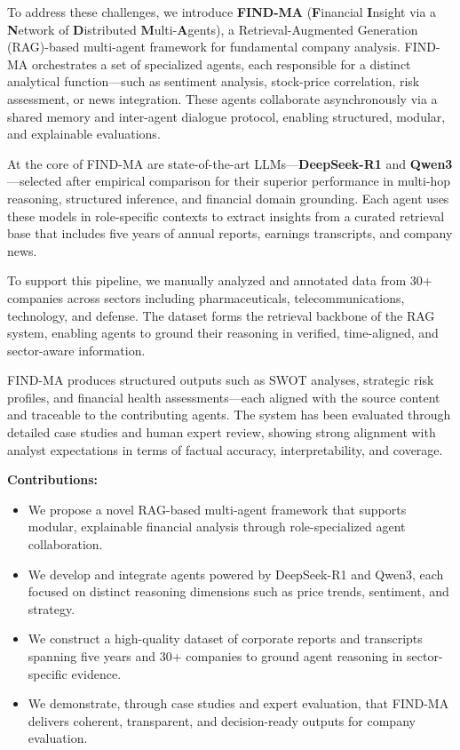\documentclass[11pt]{article}
\newcommand{\findma}{\textsc{FIND-MA}}
\begin{document}
To address these challenges, we introduce \textbf{\findma{}} (\textbf{F}inancial \textbf{I}nsight via a \textbf{N}etwork of \textbf{D}istributed \textbf{M}ulti-\textbf{A}gents), a Retrieval-Augmented Generation (RAG)-based multi-agent framework for fundamental company analysis. \findma{} orchestrates a set of specialized agents, each responsible for a distinct analytical function—such as sentiment analysis, stock-price correlation, risk assessment, or news integration. These agents collaborate asynchronously via a shared memory and inter-agent dialogue protocol, enabling structured, modular, and explainable evaluations.

At the core of \findma{} are state-of-the-art LLMs—\textbf{DeepSeek-R1} and \textbf{Qwen3}—selected after empirical comparison for their superior performance in multi-hop reasoning, structured inference, and financial domain grounding. Each agent uses these models in role-specific contexts to extract insights from a curated retrieval base that includes five years of annual reports, earnings transcripts, and company news.

To support this pipeline, we manually analyzed and annotated data from 30+ companies across sectors including pharmaceuticals, telecommunications, technology, and defense. The dataset forms the retrieval backbone of the RAG system, enabling agents to ground their reasoning in verified, time-aligned, and sector-aware information.

\findma{} produces structured outputs such as SWOT analyses, strategic risk profiles, and financial health assessments—each aligned with the source content and traceable to the contributing agents. The system has been evaluated through detailed case studies and human expert review, showing strong alignment with analyst expectations in terms of factual accuracy, interpretability, and coverage.

\textbf{Contributions:}
\begin{itemize}
    \item We propose a novel RAG-based multi-agent framework that supports modular, explainable financial analysis through role-specialized agent collaboration.
    \item We develop and integrate agents powered by DeepSeek-R1 and Qwen3, each focused on distinct reasoning dimensions such as price trends, sentiment, and strategy.
    \item We construct a high-quality dataset of corporate reports and transcripts spanning five years and 30+ companies to ground agent reasoning in sector-specific evidence.
    \item We demonstrate, through case studies and expert evaluation, that \findma{} delivers coherent, transparent, and decision-ready outputs for company evaluation.
\end{itemize}
\end{document}
